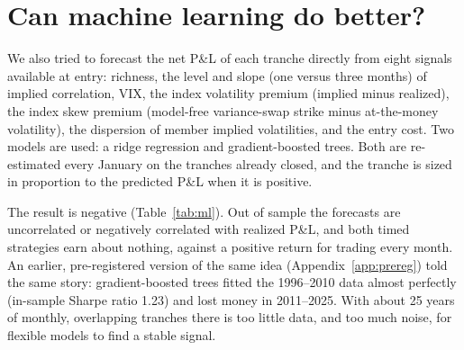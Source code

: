\section{Can machine learning do better?}\label{sec:ml}

We also tried to forecast the net P\&L of each tranche directly from eight signals available at entry: richness, the level and slope (one versus three months) of implied correlation, VIX, the index volatility premium (implied minus realized), the index skew premium (model-free variance-swap strike minus at-the-money volatility), the dispersion of member implied volatilities, and the entry cost. Two models are used: a ridge regression and gradient-boosted trees. Both are re-estimated every January on the tranches already closed, and the tranche is sized in proportion to the predicted P\&L when it is positive.

\begin{table}[t]
  \centering
  \small
  \caption{Walk-forward machine-learning timing of the correlation-weighted trade, 2003--2025. Monthly ladder P\&L per unit of vega budget; comparisons as in Table~\ref{tab:rich}.}
  \label{tab:ml}
\end{table}

The result is negative (Table~\ref{tab:ml}). Out of sample the forecasts are uncorrelated or negatively correlated with realized P\&L, and both timed strategies earn about nothing, against a positive return for trading every month. An earlier, pre-registered version of the same idea (Appendix~\ref{app:prereg}) told the same story: gradient-boosted trees fitted the 1996--2010 data almost perfectly (in-sample Sharpe ratio 1.23) and lost money in 2011--2025. With about 25 years of monthly, overlapping tranches there is too little data, and too much noise, for flexible models to find a stable signal.

